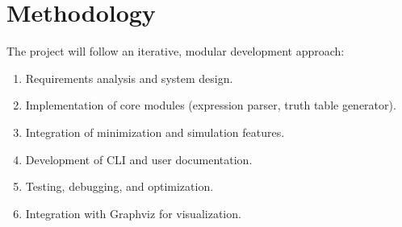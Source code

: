 \section{Methodology}
The project will follow an iterative, modular development approach:
\begin{enumerate}
    \item Requirements analysis and system design.
    \item Implementation of core modules (expression parser, truth table generator).
    \item Integration of minimization and simulation features.
    \item Development of CLI and user documentation.
    \item Testing, debugging, and optimization.
    \item Integration with Graphviz for visualization.
\end{enumerate}
